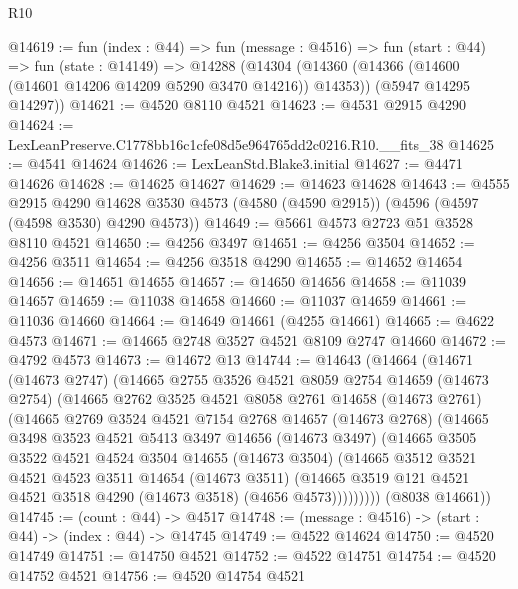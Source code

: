 \begin{lexlean}{R10}
\begin{coremodule}
@14619 := fun (index : @44) =>
  fun (message : @4516) =>
  fun (start : @44) =>
  fun (state : @14149) =>
  @14288
    (@14304
      (@14360 (@14366 (@14600 (@14601 @14206 @14209 @5290 @3470 @14216)) @14353))
      (@5947 @14295 @14297))
@14621 := @4520 @8110 @4521
@14623 := @4531 @2915 @4290
@14624 := LexLeanPreserve.C1778bb16c1cfe08d5e964765dd2c0216.R10.__fits_38
@14625 := @4541 @14624
@14626 := LexLeanStd.Blake3.initial
@14627 := @4471 @14626
@14628 := @14625 @14627
@14629 := @14623 @14628
@14643 := @4555
    @2915
    @4290
    @14628
    @3530
    @4573
    (@4580 (@4590 @2915))
    (@4596 (@4597 (@4598 @3530) @4290 @4573))
@14649 := @5661 @4573 @2723 @51 @3528 @8110 @4521
@14650 := @4256 @3497
@14651 := @4256 @3504
@14652 := @4256 @3511
@14654 := @4256 @3518 @4290
@14655 := @14652 @14654
@14656 := @14651 @14655
@14657 := @14650 @14656
@14658 := @11039 @14657
@14659 := @11038 @14658
@14660 := @11037 @14659
@14661 := @11036 @14660
@14664 := @14649 @14661 (@4255 @14661)
@14665 := @4622 @4573
@14671 := @14665 @2748 @3527 @4521 @8109 @2747 @14660
@14672 := @4792 @4573
@14673 := @14672 @13
@14744 := @14643
    (@14664
      (@14671
        (@14673 @2747)
        (@14665
          @2755
          @3526
          @4521
          @8059
          @2754
          @14659
          (@14673 @2754)
          (@14665
            @2762
            @3525
            @4521
            @8058
            @2761
            @14658
            (@14673 @2761)
            (@14665
              @2769
              @3524
              @4521
              @7154
              @2768
              @14657
              (@14673 @2768)
              (@14665
                @3498
                @3523
                @4521
                @5413
                @3497
                @14656
                (@14673 @3497)
                (@14665
                  @3505
                  @3522
                  @4521
                  @4524
                  @3504
                  @14655
                  (@14673 @3504)
                  (@14665
                    @3512
                    @3521
                    @4521
                    @4523
                    @3511
                    @14654
                    (@14673 @3511)
                    (@14665 @3519 @121 @4521 @4521 @3518 @4290 (@14673 @3518) (@4656 @4573)))))))))
      (@8038 @14661))
@14745 := (count : @44) -> @4517
@14748 := (message : @4516) -> (start : @44) -> (index : @44) -> @14745
@14749 := @4522 @14624
@14750 := @4520 @14749
@14751 := @14750 @4521
@14752 := @4522 @14751
@14754 := @4520 @14752 @4521
@14756 := @4520 @14754 @4521

\end{coremodule}
\end{lexlean}
